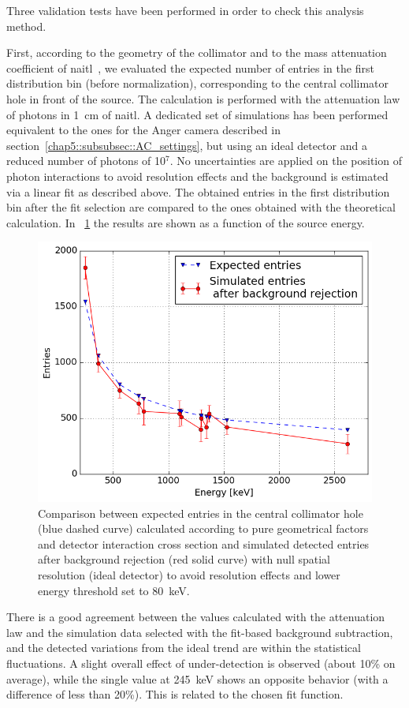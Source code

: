 Three validation tests have been performed in order to check this analysis method.

First, according to the geometry of the collimator and to the mass attenuation coefficient of \gls{naitl}~\parencite{Hubbell1987}, we evaluated the expected number of entries in the first distribution bin (before normalization), corresponding to the central collimator hole in front of the source. The calculation is performed with the attenuation law of photons in 1~cm of \gls{naitl}. A dedicated set of simulations has been performed equivalent to the ones for the Anger camera described in section~\ref{chap5::subsubsec::AC_settings}, but using an ideal detector and a reduced number of photons of 10$^7$. No uncertainties are applied on the position of photon interactions to avoid resolution effects and the background is estimated via a linear fit as described above. The obtained entries in the first distribution bin after the fit selection are compared to the ones obtained with the theoretical calculation. In \figurename~\ref{chap5::fig::firstBinCheck} the results are shown as a function of the source energy.


\begin{figure}[h]
  \centering
  \includegraphics[width=.6\textwidth]{03_GraphicFiles/chapter5_SPECTsimu/SPECT/anger/firstBinInVSenergy}
\caption{Comparison between expected entries in the central collimator hole (blue dashed curve) calculated according to pure geometrical factors and detector interaction cross section and simulated detected entries after background rejection (red solid curve) with null spatial resolution (ideal detector) to avoid resolution effects and lower energy threshold set to 80~keV.}
\label{chap5::fig::firstBinCheck}
\end{figure}

There is a good agreement between the values calculated with the attenuation law and the simulation data selected with the fit-based background subtraction, and the detected variations from the ideal trend are within the statistical fluctuations. A slight overall effect of under-detection is observed (about 10\% on average), while the single value at 245~keV shows an opposite behavior (with a difference of less than 20\%). This is related to the chosen fit function.

